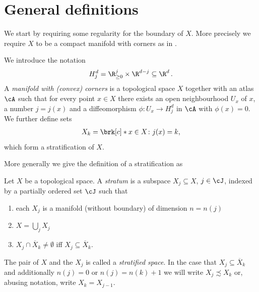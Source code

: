 \section{General definitions}

We start by requiring some regularity for the boundary of $X$.
More precisely we require $X$ to be a compact manifold with corners as in \cite{Handron2002}.
\begin{definition}
  We introduce the notation
  \begin{align*}
    H_j^d=\R_{\geq0}^j\times\R^{d-j}\subseteq\R^d\,.
  \end{align*}
  A \emph{manifold with (convex) corners} is a topological space $X$ together with an atlas $\cA$ such that for every point
  $x\in X$ there exists an open neighbourhood $U_x$ of $x$, a number $j=j(x)$ and a
  diffeomorphism $\phi\colon U_x\to H_j^d$ in $\cA$ with $\phi(x)=0$.
  We further define sets 
  \begin{align}
    X_k=\brk[c]*{x\in X\colon j(x)=k}\label{eq:def_mfCorners_stratification},
  \end{align}
  which form a stratification of $X$.
\end{definition}

More generally we give the definition of a stratification as 
\begin{definition}\label{df:stratified_space}
  Let $X$ be a topological space. A \emph{stratum} is a subspace $X_j\subseteq X$, $j\in\cJ$, indexed by a partially ordered set $\cJ$ such that
  \begin{enumerate}
    \item each $X_j$ is a manifold (without boundary) of dimension $n=n(j)$
    \item $X=\bigcup_jX_j$
    \item $X_j\cap \overline{X}_k\neq\emptyset$ iff $X_j\subseteq\overline{X}_k$.
  \end{enumerate}
  The pair of $X$ and the $X_j$ is called a \emph{stratified space}.
  In the case that $X_j\subseteq\overline{X}_k$ and additionally $n(j)=0$ or $n(j)=n(k)+1$ we will
  write $X_j\precsim X_k$ or, abusing notation, write $X_k=X_{j-1}$.
\end{definition}

